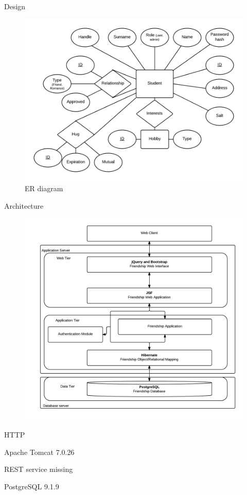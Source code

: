 \documentclass{beamer}
\begin{document}
\begin{frame}
\Large
Design
\begin{figure}[b]
\includegraphics[scale=0.3]{ER.png}
\caption{ER diagram}
\end{figure}
\end{frame}
\begin{frame}
\large
Architecture
\begin{figure}
\includegraphics[scale=0.18]{ForestView.png}
\end{figure}
\tiny
HTTP
\vspace{24pt}

Apache Tomcat 7.0.26

REST service missing

\vspace{24pt}
PostgreSQL 9.1.9

\end{frame}
\end{document}
